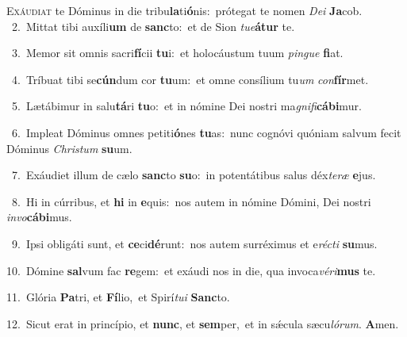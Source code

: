 \lettrine{\initial\textcolor{\initialcolor}{E}}{xáudiat} te Dóminus in die tribu\-\textbf{la}\-ti\-\textbf{ó}\-nis:~\star prótegat te nomen \textit{De}\-\textit{i} \textbf{Ja}\-cob.\\
{\numbfont\textcolor{\numbcolor}{~2.}}~Mittat tibi auxíli\textbf{um} de \textbf{sanc}\-to:~\star et de Sion \textit{tu}\-\textit{e}\textbf{á}\textbf{tur} te.\par
{\numbfont\textcolor{\numbcolor}{~3.}}~Memor sit omnis sacri\-\textbf{fí}\-cii \textbf{tu}\-i:~\star et holocáustum tuum \textit{pin}\-\textit{gue} \textbf{fi}\-at.\par
{\numbfont\textcolor{\numbcolor}{~4.}}~Tríbuat tibi se\-\textbf{cún}\-dum cor \textbf{tu}\-um:~\star et omne consílium tu\textit{um} \textit{con}\-\textbf{fír}met.\par
{\numbfont\textcolor{\numbcolor}{~5.}}~Lætábimur in salu\-\textbf{tá}\-ri \textbf{tu}\-o:~\star et in nómine Dei nostri ma\-\textit{gni}\-\textit{fi}\textbf{cá}\textbf{bi}mur.\par
{\numbfont\textcolor{\numbcolor}{~6.}}~Impleat Dóminus omnes petiti\-\textbf{ó}\-nes \textbf{tu}\-as:~\star nunc cognóvi quóniam salvum fecit Dóminus \textit{Chris}\-\textit{tum} \textbf{su}\-um.\par
{\numbfont\textcolor{\numbcolor}{~7.}}~Exáudiet illum de cælo \textbf{sanc}\-to \textbf{su}\-o:~\star in potentátibus salus déx\-\textit{te}\-\textit{ræ} \textbf{e}\-jus.\par
{\numbfont\textcolor{\numbcolor}{~8.}}~Hi in cúrribus, et \textbf{hi} in \textbf{e}\-quis:~\star nos autem in nómine Dómini, Dei nostri \textit{in}\-\textit{vo}\textbf{cá}\textbf{bi}mus.\par
{\numbfont\textcolor{\numbcolor}{~9.}}~Ipsi obligáti sunt, et \textbf{ce}\-ci\-\textbf{dé}\-runt:~\star nos autem surréximus et e\-\textit{réc}\-\textit{ti} \textbf{su}\-mus.\par
{\numbfont\textcolor{\numbcolor}{10.}}~Dómine \textbf{sal}\-vum fac \textbf{re}\-gem:~\star et exáudi nos in die, qua invoca\-\textit{vé}\-\textit{ri}\textbf{mus} te.\par
{\numbfont\textcolor{\numbcolor}{11.}}~Glória \textbf{Pa}\-tri, et \textbf{Fí}\-lio,~\star et Spirí\-\textit{tu}\-\textit{i} \textbf{Sanc}\-to.\par
{\numbfont\textcolor{\numbcolor}{12.}}~Sicut erat in princípio, et \textbf{nunc}\-, et \textbf{sem}\-per,~\star et in sǽcula sæcu\-\textit{ló}\-\textit{rum}. \textbf{A}\-men.\par
